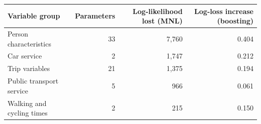 \begin{tabular}{lrrr}
\toprule
Variable group & Parameters & Log-likelihood lost (MNL) & Log-loss increase (boosting) \\
\midrule
Person characteristics & 33 & 7,760 & 0.404 \\
Car service & 2 & 1,747 & 0.212 \\
Trip variables & 21 & 1,375 & 0.194 \\
Public transport service & 5 & 966 & 0.061 \\
Walking and cycling times & 2 & 215 & 0.150 \\
\bottomrule
\end{tabular}
